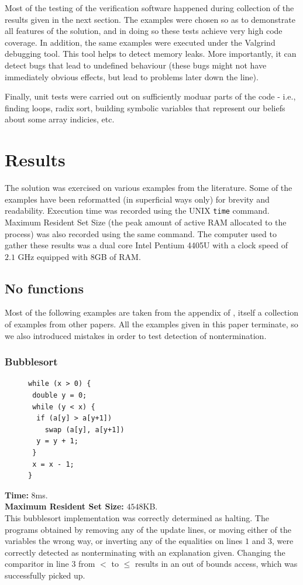 \documentclass[12pt,a4paper]{article}
\begin{document}
Most of the testing of the verification software happened during collection of the results given in the next section. The examples were chosen so as to demonstrate all features of the solution,
and in doing so these tests achieve very high code coverage. In addition, the same examples were executed under the Valgrind debugging tool. This tool helps to detect memory leaks. More importantly, it can detect bugs that lead to undefined behaviour (these bugs might not have immediately obvious effects, but lead to problems later down the line).

Finally, unit tests were carried out on sufficiently moduar parts of the code - i.e., finding loops, radix sort, building symbolic variables that represent our beliefs about some array indicies,
etc.

\newpage
\section{Results}
The solution was exercised on various examples from the literature. Some of the examples have been reformatted (in superficial ways only)
 for brevity and readability.
Execution time was recorded using the UNIX \texttt{time} command. Maximum Resident Set Size (the peak amount of active RAM allocated to the process) was also recorded using the same command. The computer used to gather these results was a dual core Intel Pentium 4405U with a clock speed of $2.1$ GHz 
equipped with $8$GB of RAM.
\subsection{No functions}
Most of the following examples are taken from the appendix of \citep{tra}, itself a collection of examples from other papers.  All the examples given in this paper terminate, so we also introduced mistakes in order to test detection of nontermination.

\subsubsection{Bubblesort}
\begin{figure}
\centering
\begin{lstlisting}[frame=tlrb,language=myLang]
while (x > 0) {
 double y = 0;
 while (y < x) {
  if (a[y] > a[y+1])
    swap (a[y], a[y+1])
  y = y + 1;
 }
 x = x - 1;
}
\end{lstlisting}
\end{figure}
\textbf{Time:} $8$ms.\\ \textbf{Maximum Resident Set Size:} $4548$KB.\\
This bubblesort implementation was correctly determined as halting. The programs obtained by removing any of the update lines, or moving either of the variables the wrong way, or inverting any of the equalities on lines $1$ and $3$, were correctly detected as nonterminating with an explanation given. Changing the comparitor in line $3$ from $<$ to $\leq$ results in an out of bounds access, which was successfully picked up.\\
\end{document}

